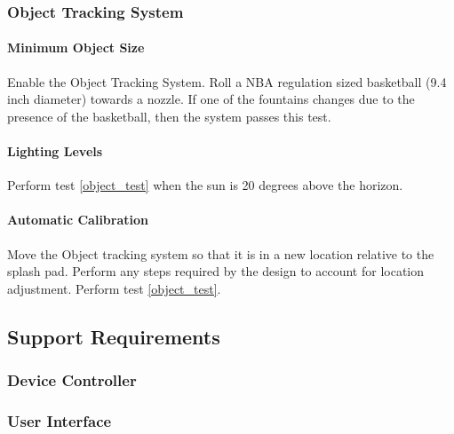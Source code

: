 \subsubsection{Object Tracking System}

\paragraph{\label{object_test}Minimum Object Size}
Enable the Object Tracking System. Roll a NBA regulation sized basketball (9.4 inch diameter) towards a nozzle. If one of the fountains changes due to the presence of the basketball, then the system passes this test. 

\paragraph{Lighting Levels}
Perform test \ref{object_test} when the sun is 20 degrees above the horizon. 

\paragraph{Automatic Calibration}
Move the Object tracking system so that it is in a new location relative to the splash pad. Perform any steps required by the design to account for location adjustment. Perform test \ref{object_test}. 

\subsection{Support Requirements}

\subsubsection{Device Controller}

\subsubsection{User Interface}

